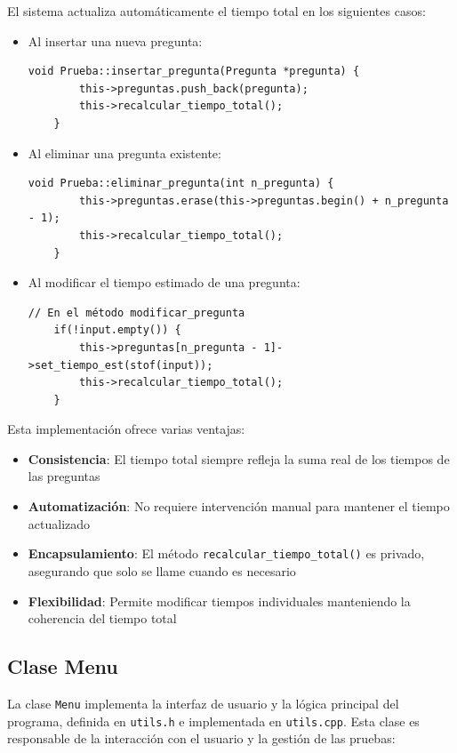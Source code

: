 \documentclass[12pt]{article}
\begin{document}
El sistema actualiza automáticamente el tiempo total en los siguientes casos:

\begin{itemize}
    \item Al insertar una nueva pregunta:
    \begin{lstlisting}[style=customc]
    void Prueba::insertar_pregunta(Pregunta *pregunta) {
        this->preguntas.push_back(pregunta);
        this->recalcular_tiempo_total();
    }
    \end{lstlisting}

    \item Al eliminar una pregunta existente:
    \begin{lstlisting}[style=customc]
    void Prueba::eliminar_pregunta(int n_pregunta) {
        this->preguntas.erase(this->preguntas.begin() + n_pregunta - 1);
        this->recalcular_tiempo_total();
    }
    \end{lstlisting}

    \item Al modificar el tiempo estimado de una pregunta:
    \begin{lstlisting}[style=customc]
    // En el método modificar_pregunta
    if(!input.empty()) {
        this->preguntas[n_pregunta - 1]->set_tiempo_est(stof(input));
        this->recalcular_tiempo_total();
    }
    \end{lstlisting}
\end{itemize}

Esta implementación ofrece varias ventajas:

\begin{itemize}
    \item \textbf{Consistencia}: El tiempo total siempre refleja la suma real de los tiempos de las preguntas
    \item \textbf{Automatización}: No requiere intervención manual para mantener el tiempo actualizado
    \item \textbf{Encapsulamiento}: El método \texttt{recalcular\_tiempo\_total()} es privado, asegurando que solo se llame cuando es necesario
    \item \textbf{Flexibilidad}: Permite modificar tiempos individuales manteniendo la coherencia del tiempo total
\end{itemize}

\subsection{Clase Menu}
La clase \texttt{Menu} implementa la interfaz de usuario y la l\'ogica principal del programa, definida en \texttt{utils.h} e implementada en \texttt{utils.cpp}. Esta clase es responsable de la interacci\'on con el usuario y la gesti\'on de las pruebas:
\end{document}

